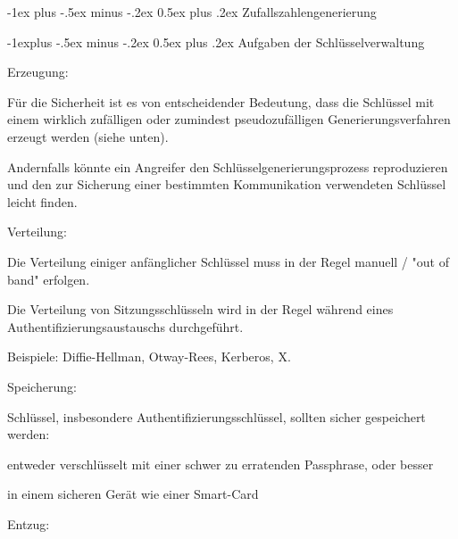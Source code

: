 \documentclass[a4paper]{article}
\makeatletter
\renewcommand{\section}{\@startsection{section}{1}{0mm}%
 {-1ex plus -.5ex minus -.2ex}%
 {0.5ex plus .2ex}%
 {\normalfont\large\bfseries}}
\renewcommand{\subsection}{\@startsection{subsection}{2}{0mm}%
 {-1explus -.5ex minus -.2ex}%
 {0.5ex plus .2ex}%
 {\normalfont\normalsize\bfseries}}
\makeatother
\begin{document}
\begin{multicols}{3}
      \section{Zufallszahlengenerierung}


      \subsection{Aufgaben der
            Schlüsselverwaltung}

      \begin{itemize*}
            \item
            Erzeugung:

            \begin{itemize*}
                  \item Für die Sicherheit ist es von entscheidender Bedeutung, dass die Schlüssel mit einem wirklich zufälligen oder zumindest pseudozufälligen Generierungsverfahren erzeugt werden (siehe unten).
                  \item Andernfalls könnte ein Angreifer den Schlüsselgenerierungsprozess reproduzieren und den zur Sicherung einer bestimmten Kommunikation verwendeten Schlüssel leicht finden.
            \end{itemize*}
            \item
            Verteilung:

            \begin{itemize*}
                  \item Die Verteilung einiger anfänglicher Schlüssel muss in der Regel manuell / "out of band" erfolgen.
                  \item Die Verteilung von Sitzungsschlüsseln wird in der Regel während eines Authentifizierungsaustauschs durchgeführt.
                  \item Beispiele: Diffie-Hellman, Otway-Rees, Kerberos, X.
            \end{itemize*}
            \item
            Speicherung:

            \begin{itemize*}
                  \item Schlüssel, insbesondere Authentifizierungsschlüssel, sollten sicher gespeichert werden:
                  \begin{itemize*} \item entweder verschlüsselt mit einer schwer zu erratenden Passphrase, oder besser \item in einem sicheren Gerät wie einer Smart-Card \end{itemize*}
            \end{itemize*}
            \item
            Entzug:


\end{itemize*}
\end{multicols}
\end{document}
